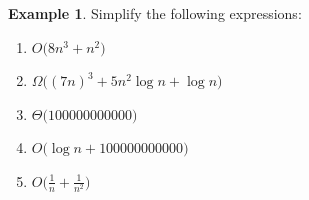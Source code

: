 \documentclass[10pt]{article}
\theoremstyle{definition}
\newtheorem{example}[problem]{Example}
\begin{document}
\begin{example}
    Simplify the following expressions:

\begin{enumerate}
    \item $O\bigg(8n^3 + n^2 \bigg)$
    \vspace{0.8in}
    \item $\Omega\bigg((7n)^3 + 5n^2\log n + \log n \bigg)$
    \vspace{0.8in}
    \item $\Theta\bigg(100000000000 \bigg)$
    \vspace{0.8in}
    \item $O\bigg(\log n + 100000000000 \bigg)$
    \vspace{0.8in}
\item $O\bigg(\frac 1 n + \frac 1 {n^2}\bigg)$
    \vspace{0.8in}
\end{enumerate}
\end{example}

\vspace{0.25in}
\noindent

\end{document}
